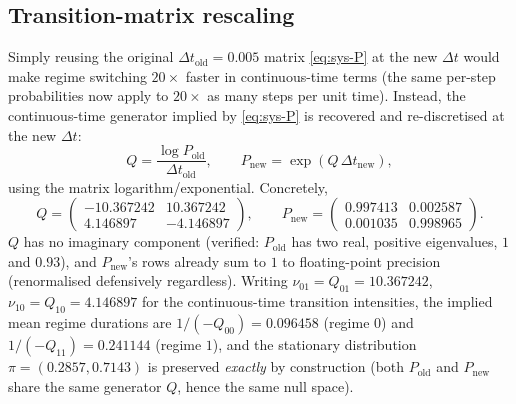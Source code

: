 \documentclass[11pt]{article}
\begin{document}
\subsection{Transition-matrix rescaling}
Simply reusing the original $\Delta t_{\text{old}}=0.005$ matrix \eqref{eq:sys-P} at the new $\Delta t$ would make regime switching $20\times$ faster in continuous-time terms (the same per-step probabilities now apply to $20\times$ as many steps per unit time). Instead, the continuous-time generator implied by \eqref{eq:sys-P} is recovered and re-discretised at the new $\Delta t$:
\begin{equation}
Q = \frac{\log P_{\text{old}}}{\Delta t_{\text{old}}}, \qquad P_{\text{new}} = \exp(Q\, \Delta t_{\text{new}}),
\label{eq:Pnew}
\end{equation}
using the matrix logarithm/exponential. Concretely,
\begin{equation}
Q = \begin{pmatrix} -10.367242 & 10.367242 \\ 4.146897 & -4.146897 \end{pmatrix}, \qquad
P_{\text{new}} = \begin{pmatrix} 0.997413 & 0.002587 \\ 0.001035 & 0.998965 \end{pmatrix}.
\end{equation}
$Q$ has no imaginary component (verified: $P_{\text{old}}$ has two real, positive eigenvalues, $1$ and $0.93$), and $P_{\text{new}}$'s rows already sum to $1$ to floating-point precision (renormalised defensively regardless). Writing $\nu_{01}=Q_{01}=10.367242$, $\nu_{10}=Q_{10}=4.146897$ for the continuous-time transition intensities, the implied mean regime durations are $1/(-Q_{00})=0.096458$ (regime $0$) and $1/(-Q_{11})=0.241144$ (regime $1$), and the stationary distribution $\pi = (0.2857, 0.7143)$ is preserved \emph{exactly} by construction (both $P_{\text{old}}$ and $P_{\text{new}}$ share the same generator $Q$, hence the same null space).
\end{document}
